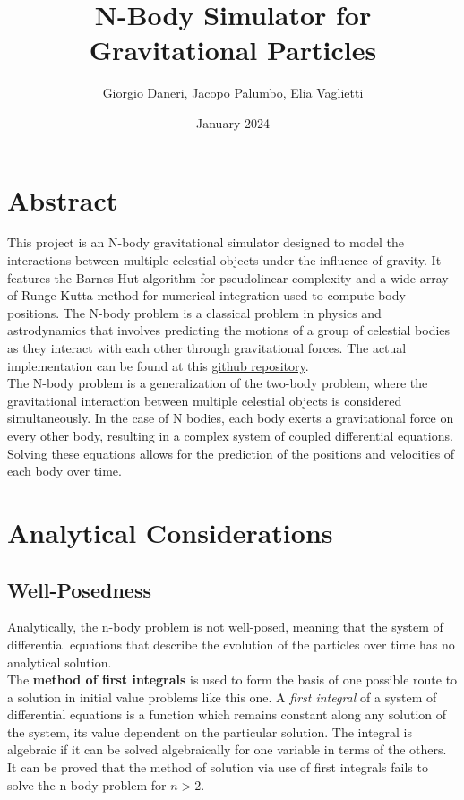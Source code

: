 \documentclass{article}
\title{N-Body Simulator for Gravitational Particles}
\author{Giorgio Daneri, Jacopo Palumbo, Elia Vaglietti}
\date{January 2024}
\begin{document}
\maketitle


\section{Abstract}
This project is an N-body gravitational simulator designed to model the interactions between multiple celestial objects under the influence of gravity. It features the Barnes-Hut algorithm for pseudolinear complexity and a wide array of Runge-Kutta method for numerical integration used to compute body positions. The N-body problem is a classical problem in physics and astrodynamics that involves predicting the motions of a group of celestial bodies as they interact with each other through gravitational forces. The actual implementation can be found at this \href{https://github.com/AMSC22-23/N-Body-simulator}{github repository}. \\
The N-body problem is a generalization of the two-body problem, where the gravitational interaction between multiple celestial objects is considered simultaneously. In the case of N bodies, each body exerts a gravitational force on every other body, resulting in a complex system of coupled differential equations. Solving these equations allows for the prediction of the positions and velocities of each body over time.

\section{Analytical Considerations}

\subsection{Well-Posedness}

Analytically, the n-body problem is not well-posed, meaning that the system of differential equations that describe the evolution of the particles over time has no analytical solution. \\
The \textbf{method of first integrals} is used to form the basis of one possible route to a solution in initial value problems like this one. A \textit{first integral} of a system of differential equations is a function which remains constant along any solution of the system, its value dependent on the particular solution. The integral is algebraic if it can be solved algebraically for one variable in terms of the others.
It can be proved that the method of solution via use of first integrals fails to solve the n-body problem for $n > 2$. \cite{senchyna2013less} \\
\end{document}
